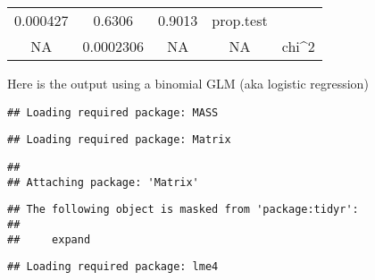 \documentclass[]{book}
\theoremstyle{definition}
\theoremstyle{definition}
\theoremstyle{definition}
\theoremstyle{remark}
\begin{document}
\begin{longtable}[]{@{}ccccc@{}}
\begin{minipage}[t]{0.14\columnwidth}
0.000427\strut
\end{minipage} & \begin{minipage}[t]{0.13\columnwidth}\centering\strut
0.6306\strut
\end{minipage} & \begin{minipage}[t]{0.14\columnwidth}\centering\strut
0.9013\strut
\end{minipage} & \begin{minipage}[t]{0.14\columnwidth}\centering\strut
prop.test\strut
\end{minipage}\tabularnewline
\begin{minipage}[t]{0.13\columnwidth}\centering\strut
NA\strut
\end{minipage} & \begin{minipage}[t]{0.14\columnwidth}\centering\strut
0.0002306\strut
\end{minipage} & \begin{minipage}[t]{0.13\columnwidth}\centering\strut
NA\strut
\end{minipage} & \begin{minipage}[t]{0.14\columnwidth}\centering\strut
NA\strut
\end{minipage} & \begin{minipage}[t]{0.14\columnwidth}\centering\strut
chi\^{}2\strut
\end{minipage}\tabularnewline
\bottomrule
\end{longtable}

Here is the output using a binomial GLM (aka logistic regression)

\begin{verbatim}
## Loading required package: MASS
\end{verbatim}

\begin{verbatim}
## Loading required package: Matrix
\end{verbatim}

\begin{verbatim}
## 
## Attaching package: 'Matrix'
\end{verbatim}

\begin{verbatim}
## The following object is masked from 'package:tidyr':
## 
##     expand
\end{verbatim}

\begin{verbatim}
## Loading required package: lme4
\end{verbatim}
\end{document}
